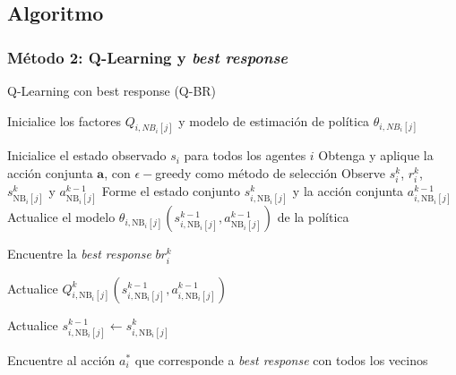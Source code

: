 \documentclass[11pt]{beamer}
\begin{document}
\subsection{Algoritmo}
\begin{frame}[fragile]
\frametitle{Método 2: Q-Learning y \textit{best response}}

\begin{algorithm}[H]
\scriptsize %
\caption{Q-Learning con best response (Q-BR)}\label{alg:Q-BR}
\begin{algorithmic}[]
\State Inicialice los factores $Q_{i,NB_i[j]}$ y modelo de estimación de política $\theta_{i,NB_i[j]}$

	\State Inicialice el estado observado $s_i$ para todos los agentes $i$
		\State Obtenga y aplique la acción conjunta $\mathbf{a}$, con $\epsilon-$greedy como método de selección
				\State Observe $s_i^k$, $r_i^k$, $s_{\mathrm{NB}_i[j]}^k$ y $a_{\mathrm{NB}_i[j]}^{k-1}$
				\State Forme el estado conjunto $s_{i,\mathrm{NB}_i[j]}^k$ y la acción conjunta $a_{i,\mathrm{NB}_i[j]}^{k-1}$
				\State Actualice el modelo $\theta_{i,\mathrm{NB}_i[j]}(s_{i,\mathrm{NB}_i[j]}^{k-1}, a_{\mathrm{NB}_i[j]}^{k-1})$ de la política

				\State Encuentre la \textit{best response} $br_i^k$

				\State Actualice $Q_{i,\mathrm{NB}_i[j]}^{k}(s_{i,\mathrm{NB}_i[j]}^{k-1},a_{i,\mathrm{NB}_i[j]}^{k-1})$

				\State Actualice $s_{i,\mathrm{NB}_i[j]}^{k-1} \leftarrow s_{i,\mathrm{NB}_i[j]}^k$
			\EndFor

			\State Encuentre al acción $a_i^*$ que corresponde a \textit{best response} con todos los vecinos
		\EndFor
	\EndFor
\EndFor
\end{algorithmic}
\end{algorithm}
\end{frame}
\end{document}
